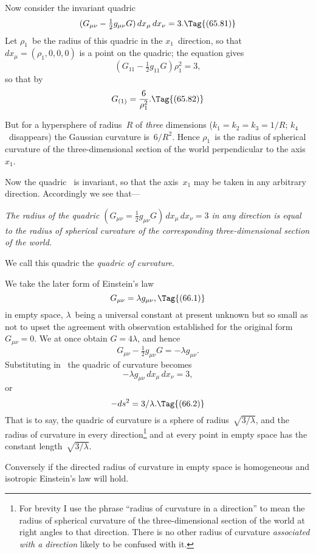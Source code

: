 \documentclass[12pt]{book}
\begin{document}
Now consider the invariant quadric
\[
(G_{\mu\nu} - \tfrac{1}{2} g_{\mu\nu} G)\, dx_{\mu}\, dx_{\nu} = 3.
\Tag{(65.81)}
\]
Let $\rho_{1}$~be the radius of this quadric in the $x_{1}$~direction, so that $dx_{\mu} = (\rho_{1} , 0, 0, 0)$
is a point on the quadric; the equation gives
\[
(G_{11} - \tfrac{1}{2} g_{11}G) \rho_{1}^{2} = 3,
\]
so that by~
\[
G_{(1)} = \frac{6}{\rho_{1}^{2}}.
\Tag{(65.82)}
\]

But for a hypersphere of radius~$R$ of \emph{three} dimensions ($k_{1} = k_{2} = k_{3} = 1/R$;
$k_{4}$~disappears) the Gaussian curvature is~$6/R^{2}$. Hence $\rho_{1}$~is the radius of
spherical curvature of the three-dimensional section of the world perpendicular
to the axis~$x_{1}$.

Now the quadric~ is invariant, so that the axis~$x_{1}$ may be taken in
any arbitrary direction. Accordingly we see that---

\emph{The radius of the quadric $(G_{\mu\nu} = \tfrac{1}{2} g_{\mu\nu}G)\, dx_{\mu}\, dx_{\nu} = 3$ in any direction is equal
to the radius of spherical curvature of the corresponding three-dimensional
section of the world.}

We call this quadric the \emph{quadric of curvature}.
%


We take the later form of Einstein's law~
\[
G_{\mu\nu} = \lambda g_{\mu\nu},
\Tag{(66.1)}
\]
in empty space, $\lambda$~being a universal constant at present unknown but so small
as not to upset the agreement with observation established for the original
form $G_{\mu\nu} = 0$. We at once obtain $G = 4\lambda$, and hence
\[
G_{\mu\nu} - \tfrac{1}{2} g_{\mu\nu} G = -\lambda g_{\mu\nu}.
\]
Substituting in~ the quadric of curvature becomes
\[
-\lambda g_{\mu\nu}\, dx_{\mu}\, dx_{\nu} = 3,
\]
or
\[
-ds^{2} = 3/\lambda.
\Tag{(66.2)}
\]
That is to say, the quadric of curvature is a sphere of radius~$\sqrt{3/\lambda}$, and the
radius of curvature in every direction\footnote
  {For brevity I use the phrase ``radius of curvature in a direction'' to mean the radius of
  spherical curvature of the three-dimensional section of the world at right angles to that direction.
  There is no other radius of curvature \emph{associated with a direction} likely to be confused with it.}
and at every point in empty space has
the constant length~$\sqrt{3/\lambda}$.

Conversely if the directed radius of curvature in empty space is homogeneous
and isotropic Einstein's law will hold.
\end{document}
